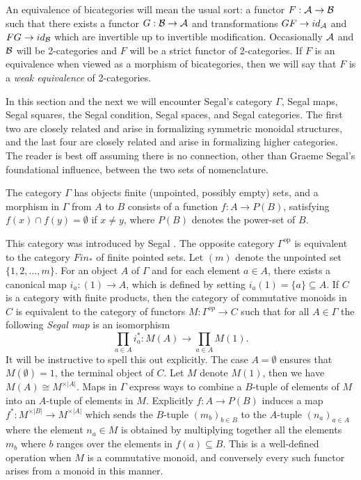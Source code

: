 \documentclass[a4paper]{amsart}
\begin{document}
An equivalence of bicategories will mean the usual sort: a functor $F: \mathcal A \to \mathcal B$ such that there exists a functor $G: \mathcal B \to \mathcal A$ and transformations $GF \to id_{\mathcal A}$ and $FG \to id_{\mathcal B}$ which are invertible up to invertible modification. Occasionally $\mathcal A$ and $\mathcal B$ will be 2-categories and $F$ will be a strict functor of 2-categories. If $F$ is an equivalence when viewed as a morphism of bicategories, then we will say that $F$ is a {\em weak equivalence} of 2-categories. 


\begin{warning}
In this section and the next we will encounter Segal's category $\Gamma$, Segal maps, Segal squares, the Segal condition, Segal spaces, and Segal categories.  The first two are closely related and arise in formalizing symmetric monoidal structures, and the last four are closely related and arise in formalizing higher categories.  The reader is best off assuming there is no connection, other than Graeme Segal's foundational influence, between the two sets of nomenclature.
\end{warning}

\begin{definition}
	The category  $\Gamma$ has objects finite (unpointed, possibly empty) sets, and a morphism in $\Gamma$ from $A$ to $B$ consists of a function $f: A \to P(B)$, satisfying $f(x) \cap f(y) = \emptyset$ if $x \neq y$, where $P(B)$ denotes the power-set of $B$. 
\end{definition}

\nid This category was introduced by Segal \cite{MR0353298}.  The opposite category $\Gamma^\textrm{op}$ is equivalent to the category $Fin_*$ of finite pointed sets. Let $(m)$ denote the unpointed set $\{ 1, 2, \dots, m\}$. For an object $A$ of $\Gamma$ and for each element $a \in A$, there exists a canonical map $i_a: (1) \to A$, which is defined by setting $i_a(1) = \{a\} \subseteq A$. If $C$ is a category with finite products, then the category of commutative monoids in $C$ is equivalent to the category of functors $M:\Gamma^{op} \to C$ such that for all $A\in \Gamma$ the following {\em Segal map} is an isomorphism
\begin{equation*}
	\prod_{a \in A} i_a^*: M(A) \to \prod_{a \in A} M(1).
\end{equation*}
It will be instructive to spell this out explicitly. The case $A=\emptyset$ ensures that $M(\emptyset) = 1$, the terminal object of $C$.  Let $M$ denote $M(1)$, then we have $M(A) \cong M^{\times |A|}$. Maps in $\Gamma$ express ways to combine a $B$-tuple of elements of $M$ into an $A$-tuple of elements in $M$. Explicitly $f: A \to P(B)$
induces a map $f^*: M^{\times |B|} \to M^{\times |A|}$ which sends the $B$-tuple $(m_b)_{b \in B}$ to the $A$-tuple $(n_a)_{a \in A}$ where the element $n_a \in M$ is obtained by multiplying together all the elements $m_b$ where $b$ ranges over the elements in $f(a) \subseteq B$. This is a well-defined operation when $M$ is a commutative monoid, and conversely every such functor arises from a monoid in this manner. 
\end{document}
